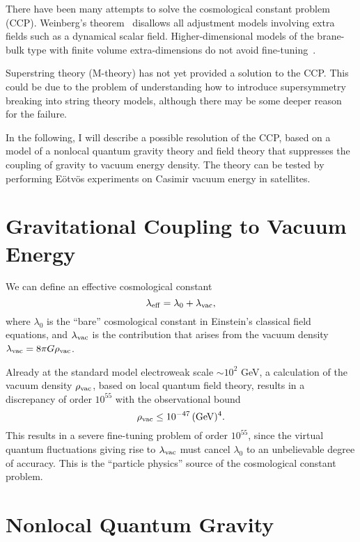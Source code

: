 \documentclass[a4paper,12pt]{article}
\begin{document}
There have been many attempts to solve the cosmological constant
problem (CCP). Weinberg's theorem~\cite{Weinberg} disallows all adjustment
models involving extra fields such as a dynamical scalar field.
Higher-dimensional models of the brane-bulk type with finite volume
extra-dimensions do not avoid fine-tuning~\cite{Cline}.

Superstring theory (M-theory) has not yet provided a solution to the
CCP. This could be due to the problem of understanding how to introduce
supersymmetry breaking into string theory models, although there may be
some deeper reason for the failure.

In the following, I will describe a possible resolution of
the CCP, based on a model of a nonlocal
quantum gravity theory and field theory that suppresses the coupling of
gravity to vacuum energy density. The theory can be tested by performing
E\"otv\"os experiments on Casimir vacuum energy in satellites.

\section{\bf Gravitational Coupling to Vacuum Energy}

We can define an effective cosmological constant
\begin{equation}
\lambda_{\rm eff}=\lambda_0+\lambda_{\rm vac},
\end{equation}
where $\lambda_0$ is the ``bare'' cosmological
constant in Einstein's classical field equations,
and $\lambda_{\rm vac}$ is the contribution that arises from the
vacuum density $\lambda_{\rm vac}=8\pi G\rho_{\rm vac}$.

Already at the standard model electroweak scale $\sim 10^2$ GeV, a
calculation of the vacuum density $\rho_{\rm vac}$, based on local quantum field
theory, results in a discrepancy of order $10^{55}$ with the observational
bound
\begin{equation}
\label{vacbound}
\rho_{\rm vac} \leq 10^{-47}\, ({\rm GeV})^4.
\end{equation}
This results in a severe fine-tuning problem of order $10^{55}$,
since the virtual quantum fluctuations giving rise to $\lambda_{\rm vac}$
must cancel $\lambda_0$ to an unbelievable degree of accuracy.
This is the ``particle physics'' source of the cosmological
constant problem.

\section{\bf Nonlocal Quantum Gravity}
\end{document}

